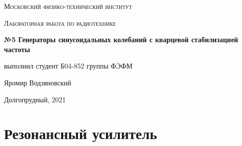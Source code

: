\documentclass[a4paper]{article}
\begin{document}
\graphicspath{ {pictures/} }

\begin{titlepage}
	\centering
	\vspace{5cm}
    {\scshape\LARGE Московский физико-технический институт\par}
	\vspace{5cm}
	{\scshape\Large Лабораторная работа по радиотехнике \par}
	\vspace{1cm}
    {\huge\bfseries  №5 Генераторы синусоидальных колебаний с кварцевой стабилизацией частоты \par}
	\vspace{1cm}
	\vfill
    \begin{flushright}
        {\large выполнил студент Б04-852 группы ФЭФМ}\par
        \vspace{0.3cm}
        {\LARGE Яромир Водзяновский}
    \end{flushright}
	\vfill
Долгопрудный, 2021
\end{titlepage}

\pagestyle{fancy} 
\fancyhead[C]{}
\fancyfoot[C]{ \noindent\rule{\textwidth}{0.4pt} \thepage }

\newcommand{\ap}{\approx}
\newcommand{\cb}[1]{\begin{center}\fbox{#1} \end{center}}
\newcommand{\cc}[1]{\begin{center} #1 \end{center}}

\newpage



\section{Резонансный усилитель}
\end{document}
